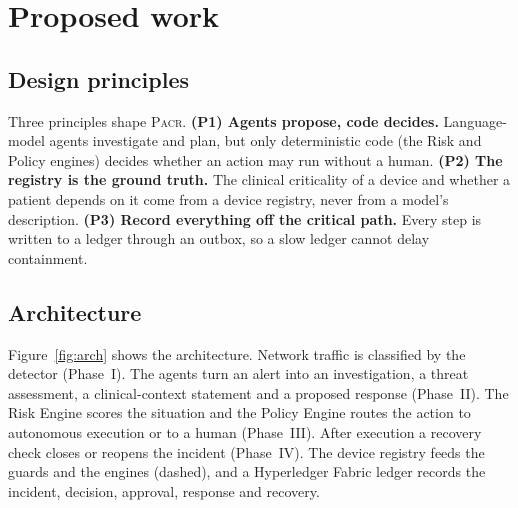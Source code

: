 \documentclass[preprint,12pt]{elsarticle}
\newcommand{\pacr}{\textsc{Pacr}}
\begin{document}
\section{Proposed work}
\label{sec:method}

\subsection{Design principles}
Three principles shape \pacr. \textbf{(P1) Agents propose, code decides.} Language-model agents investigate and plan, but only deterministic code (the Risk and Policy engines) decides whether an action may run without a human. \textbf{(P2) The registry is the ground truth.} The clinical criticality of a device and whether a patient depends on it come from a device registry, never from a model's description. \textbf{(P3) Record everything off the critical path.} Every step is written to a ledger through an outbox, so a slow ledger cannot delay containment.

\subsection{Architecture}
Figure~\ref{fig:arch} shows the architecture. Network traffic is classified by the detector (Phase~I). The agents turn an alert into an investigation, a threat assessment, a clinical-context statement and a proposed response (Phase~II). The Risk Engine scores the situation and the Policy Engine routes the action to autonomous execution or to a human (Phase~III). After execution a recovery check closes or reopens the incident (Phase~IV). The device registry feeds the guards and the engines (dashed), and a Hyperledger Fabric ledger records the incident, decision, approval, response and recovery.
\end{document}
